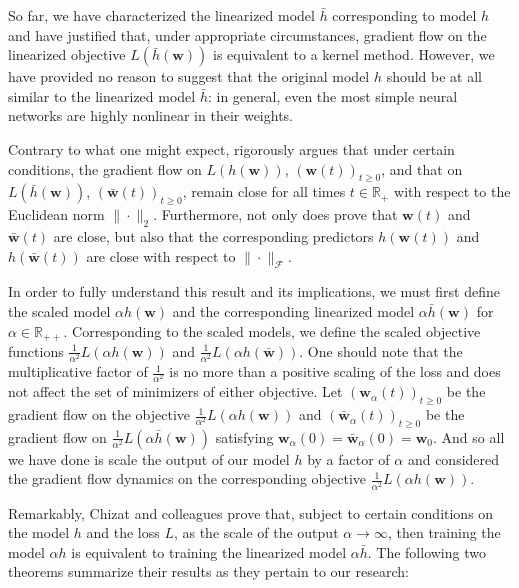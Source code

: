 \documentclass{article}
\begin{document}
So far, we have characterized the linearized model $\bar{h}$ corresponding to model $h$ and have justified that, under appropriate circumstances, gradient flow on the linearized objective $L(\bar{h}(\boldsymbol{w}))$ is equivalent to a kernel method. However, we have provided no reason to suggest that the original model $h$ should be at all similar to the linearized model $\bar{h}$: in general, even the most simple neural networks are highly nonlinear in their weights. 

Contrary to what one might expect, \cite{chizat2018lazy} rigorously argues that under certain conditions, the gradient flow on $L(h(\boldsymbol{w}))$, $(\boldsymbol{w}(t))_{t \geq 0}$, and that on $L(\bar{h}(\boldsymbol{w}))$, $(\boldsymbol{\bar{w}}(t))_{t \geq 0}$, remain close for all times $t \in \mathbb{R}_+$ with respect to the Euclidean norm $\| \cdot \|_2$. Furthermore, not only does \cite{chizat2018lazy} prove that $\boldsymbol{w}(t)$ and $\boldsymbol{\bar{w}}(t)$ are close, but also that the corresponding predictors $h(\boldsymbol{w}(t))$ and $h(\boldsymbol{\bar{w}}(t))$ are close with respect to $\| \cdot \|_{\mathcal{F}}$.

In order to fully understand this result and its implications, we must first define the scaled model $\alpha h(\boldsymbol{w})$ and the corresponding linearized model $\alpha \bar{h}(\boldsymbol{w})$ for $\alpha \in \mathbb{R}_{++}$. Corresponding to the scaled models, we define the scaled objective functions $\frac{1}{\alpha^2}L(\alpha h(\boldsymbol{w}))$ and $\frac{1}{\alpha^2}L(\alpha h(\boldsymbol{\bar{w}}))$. One should note that the multiplicative factor of $\frac{1}{\alpha^2}$ is no more than a positive scaling of the loss and does not affect the set of minimizers of either objective. Let $(\boldsymbol{w}_{\alpha}(t))_{t \geq 0}$ be the gradient flow on the objective $\frac{1}{\alpha^2}L(\alpha h(\boldsymbol{w}))$ and $(\boldsymbol{\bar{w}}_{\alpha}(t))_{t \geq 0}$ be the gradient flow on $\frac{1}{\alpha^2}L(\alpha \bar{h}(\boldsymbol{w}))$ satisfying $\boldsymbol{w}_{\alpha}(0) = \boldsymbol{\bar{w}}_{\alpha}(0) = \boldsymbol{w}_0$. And so all we have done is scale the output of our model $h$ by a factor of $\alpha$ and considered the gradient flow dynamics on the corresponding objective $\frac{1}{\alpha^2}L(\alpha h(\boldsymbol{w}))$.

Remarkably, Chizat and colleagues prove that, subject to certain conditions on the model $h$ and the loss $L$, as the scale of the output $\alpha \rightarrow \infty$, then training the model $\alpha h$ is equivalent to training the linearized model $\alpha \bar{h}$. The following two theorems summarize their results as they pertain to our research:
\end{document}
